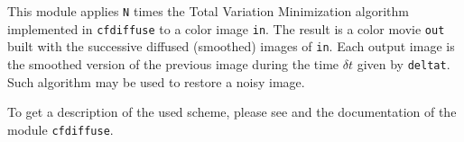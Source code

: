 
This module applies \verb+N+ times the Total Variation Minimization algorithm 
implemented in \verb+cfdiffuse+ to a color image \verb+in+.
The result is a color movie \verb+out+ built with the successive diffused (smoothed) images of \verb+in+.
Each output image is the smoothed version of the previous image during the time $\delta t$ given by \verb+deltat+.
Such algorithm may be used to restore a noisy image.

To get a description of the used scheme, please see \cite{chambolle.lions:image} and
the documentation of the module \verb+cfdiffuse+.

